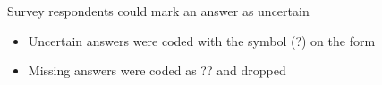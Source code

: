 \documentclass[11pt,aspectratio=169]{beamer}
\begin{document}
\begin{frame}{Survey respondents could mark an answer as uncertain}
  \begin{itemize}
    \item Uncertain answers were coded with the symbol (?) on the form
    \item Missing answers were coded as ?? and dropped
  \end{itemize}
\end{frame}
\end{document}
